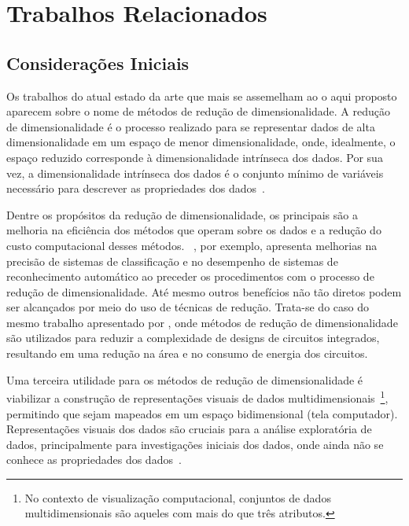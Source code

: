 \chapter{Trabalhos Relacionados}\label{chap:revisao}

\section{Considerações Iniciais}


Os trabalhos do atual estado da arte que mais se assemelham ao o aqui proposto aparecem sobre o nome de métodos de redução de dimensionalidade. 
A redução de dimensionalidade é o processo realizado para se representar dados de alta dimensionalidade em um espaço de menor dimensionalidade, onde, idealmente, o espaço reduzido corresponde à dimensionalidade intrínseca dos dados. 
Por sua vez, a dimensionalidade intrínseca dos dados é o conjunto mínimo de variáveis necessário para descrever as propriedades dos dados~\cite{Fukunaga1990}.

Dentre os propósitos da redução de dimensionalidade, os principais são a melhoria na eficiência dos métodos que operam sobre os dados e a redução do custo computacional desses métodos.  
\citeauthor{Konig2000}~\cite{Konig2000}, por exemplo, apresenta melhorias na precisão de sistemas de classificação e no desempenho de sistemas de reconhecimento automático ao preceder os procedimentos com o processo de redução de dimensionalidade. 
Até mesmo outros benefícios não tão diretos podem ser alcançados por meio do uso de técnicas de redução. 
Trata-se do caso do mesmo trabalho apresentado por \citeauthor{Konig2000}, onde métodos de redução de dimensionalidade são utilizados para reduzir a complexidade de designs de circuitos integrados, resultando em uma redução na área e no consumo de energia dos circuitos.

Uma terceira utilidade para os métodos de redução de dimensionalidade é viabilizar a construção de representações visuais de dados multidimensionais~\footnote{No contexto de visualização computacional, conjuntos de dados multidimensionais são aqueles com mais do que três atributos.}, permitindo que sejam mapeados em um espaço bidimensional (tela computador).
Representações visuais dos dados são cruciais para a análise exploratória de dados, principalmente para investigações iniciais dos dados, onde ainda não se conhece as propriedades dos dados~\cite{Kaski2011}. 

